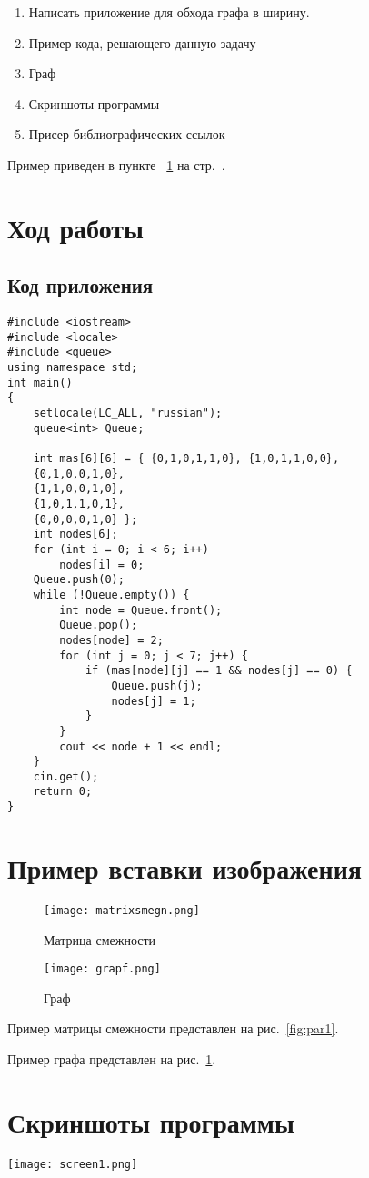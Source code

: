 \documentclass[12pt,a4paper]{scrartcl}
\begin{document}
\begin{enumerate}
 \item Написать приложение для обхода графа в ширину.
 \item Пример кода, решающего данную задачу
 \item Граф
 \item Скриншоты программы
 \item Присер библиографических ссылок
\end{enumerate}

Пример приведен в пункте ~\ref{sec:exp} на стр.~\pageref{sec:exp}.

\section{Ход работы}
\label{sec:exp}

\subsection{Код приложения}
\label{sec:exp:code}
\begin{verbatim}
#include <iostream>
#include <locale>
#include <queue>
using namespace std;
int main()
{
	setlocale(LC_ALL, "russian");
	queue<int> Queue;

	int mas[6][6] = { {0,1,0,1,1,0}, {1,0,1,1,0,0},
	{0,1,0,0,1,0},
	{1,1,0,0,1,0},
	{1,0,1,1,0,1},
	{0,0,0,0,1,0} };
	int nodes[6];
	for (int i = 0; i < 6; i++)
		nodes[i] = 0;
	Queue.push(0);
	while (!Queue.empty()) {
		int node = Queue.front();
		Queue.pop();
		nodes[node] = 2;
		for (int j = 0; j < 7; j++) {
			if (mas[node][j] == 1 && nodes[j] == 0) {
				Queue.push(j);
				nodes[j] = 1;
			}
		}
		cout << node + 1 << endl;
	}
	cin.get();
	return 0;
}
\end{verbatim}
\section{Пример вставки изображения}
\label{sec:picexample}
\begin{figure}[h]
    \texttt{[image: matrixsmegn.png]}
    \caption{Матрица смежности}\label{fig:par1}
	\texttt{[image: grapf.png]}
	\caption{Граф}\label{fig:par}
\end{figure}
Пример матрицы смежности представлен на рис.~\ref{fig:par1}.

Пример графа представлен на рис.~\ref{fig:par}.

\section{Скриншоты программы}
\texttt{[image: screen1.png]}
\end{document}
